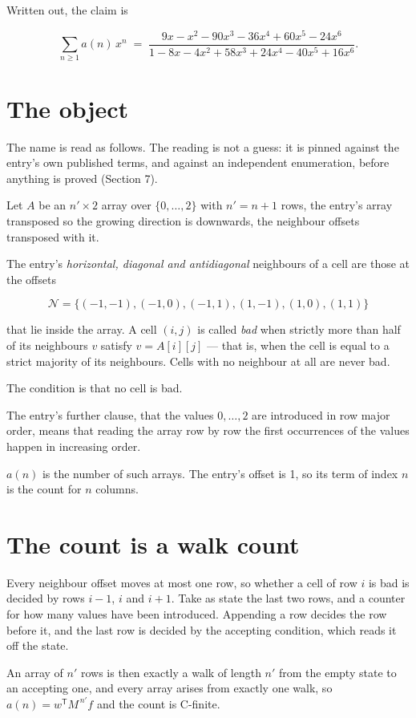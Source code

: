 \documentclass[11pt]{article}
\theoremstyle{definition}
\begin{document}
Written out, the claim is

\[\sum_{n \ge 1} a(n)\,x^n \;=\; \frac{9x - x^{2} - 90x^{3} - 36x^{4} + 60x^{5} - 24x^{6}}{1 - 8x - 4x^{2} + 58x^{3} + 24x^{4} - 40x^{5} + 16x^{6}}.\]

\section{The object}

The name is read as follows. The reading is not a guess: it is pinned against the entry's own published terms, and against an independent enumeration, before anything is proved (Section 7).

Let $A$ be an $n' \times 2$ array over $\{0,\dots,2\}$ with $n' = n + 1$ rows, the entry's array transposed so the growing direction is downwards, the neighbour offsets transposed with it.

The entry's {\itshape horizontal, diagonal and antidiagonal} neighbours of a cell are those at the offsets

\[\mathcal{N} = \{(-1,-1), (-1,0), (-1,1), (1,-1), (1,0), (1,1)\}\]

that lie inside the array. A cell $(i,j)$ is called {\itshape bad} when strictly more than half of its neighbours $v$ satisfy $v = A[i][j]$ --- that is, when the cell is equal to a strict majority of its neighbours. Cells with no neighbour at all are never bad.

The condition is that no cell is bad.

The entry's further clause, that the values $0,\dots,2$ are introduced in row major order, means that reading the array row by row the first occurrences of the values happen in increasing order.

$a(n)$ is the number of such arrays. The entry's offset is 1, so its term of index $n$ is the count for $n$ columns.

\section{The count is a walk count}

Every neighbour offset moves at most one row, so whether a cell of row $i$ is bad is decided by rows $i-1$, $i$ and $i+1$. Take as state the last two rows, and a counter for how many values have been introduced. Appending a row decides the row before it, and the last row is decided by the accepting condition, which reads it off the state.

An array of $n'$ rows is then exactly a walk of length $n'$ from the empty state to an accepting one, and every array arises from exactly one walk, so $a(n) = w^{\mathsf T}M^{\,n'}f$ and the count is C-finite.
\end{document}
